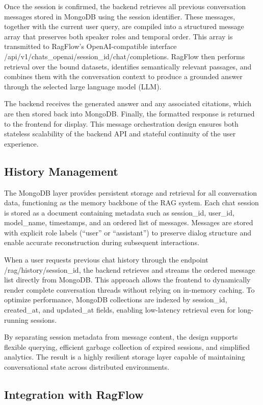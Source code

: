 Once the session is confirmed, the backend retrieves all previous conversation messages stored in MongoDB using the session identifier. These messages, together with the current user query, are compiled into a structured message array that preserves both speaker roles and temporal order. This array is transmitted to RagFlow’s OpenAI-compatible interface /api/v1/chats\_openai/{session\_id}/chat/completions. RagFlow then performs retrieval over the bound datasets, identifies semantically relevant passages, and combines them with the conversation context to produce a grounded answer through the selected large language model (LLM).

The backend receives the generated answer and any associated citations, which are then stored back into MongoDB. Finally, the formatted response is returned to the frontend for display. This message orchestration design ensures both stateless scalability of the backend API and stateful continuity of the user experience.

\subsection{History Management}
The MongoDB layer provides persistent storage and retrieval for all conversation data, functioning as the memory backbone of the RAG system. Each chat session is stored as a document containing metadata such as session\_id, user\_id, model\_name, timestamps, and an ordered list of messages. Messages are stored with explicit role labels (“user” or “assistant”) to preserve dialog structure and enable accurate reconstruction during subsequent interactions.

When a user requests previous chat history through the endpoint /rag/history/{session\_id}, the backend retrieves and streams the ordered message list directly from MongoDB. This approach allows the frontend to dynamically render complete conversation threads without relying on in-memory caching. To optimize performance, MongoDB collections are indexed by session\_id, created\_at, and updated\_at fields, enabling low-latency retrieval even for long-running sessions.

By separating session metadata from message content, the design supports flexible querying, efficient garbage collection of expired sessions, and simplified analytics. The result is a highly resilient storage layer capable of maintaining conversational state across distributed environments.

\subsection{Integration with RagFlow}

